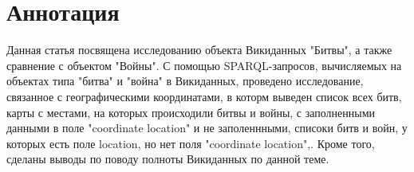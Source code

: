 \section{Аннотация}

Данная статья посвящена исследованию объекта Викиданных "Битвы", а также сравнение с объектом "Войны". С помощью SPARQL-запросов, вычисляемых на объектах типа "битва" и "война" в Викиданных, проведено исследование, связанное с географическими координатами, в которм выведен список всех битв, карты с местами, на которых происходили битвы и войны, с заполненными данными в поле "coordinate location" и не заполеннными, списоки битв и войн, у которых есть поле location, но нет поля "coordinate location",. Кроме того, сделаны выводы по поводу полноты Викиданных по данной теме.